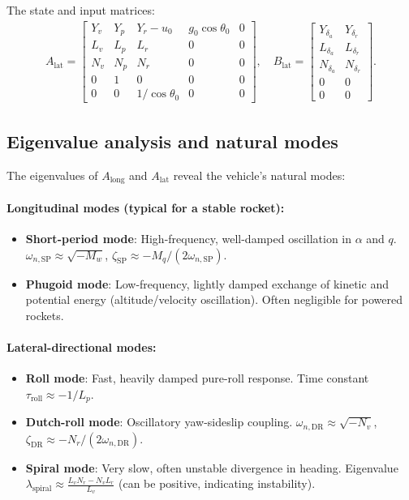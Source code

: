 \documentclass[11pt]{article}
\begin{document}
The state and input matrices:
\begin{align}
A_{\text{lat}} = \begin{bmatrix}
Y_v & Y_p & Y_r-u_0 & g_0\cos\theta_0 & 0\\
L_v & L_p & L_r & 0 & 0\\
N_v & N_p & N_r & 0 & 0\\
0 & 1 & 0 & 0 & 0\\
0 & 0 & 1/\cos\theta_0 & 0 & 0
\end{bmatrix},\quad
B_{\text{lat}} = \begin{bmatrix}
Y_{\delta_a} & Y_{\delta_r}\\
L_{\delta_a} & L_{\delta_r}\\
N_{\delta_a} & N_{\delta_r}\\
0 & 0\\
0 & 0
\end{bmatrix}.
\end{align}

\subsection{Eigenvalue analysis and natural modes}
The eigenvalues of $A_{\text{long}}$ and $A_{\text{lat}}$ reveal the vehicle's natural modes:

\paragraph{Longitudinal modes (typical for a stable rocket):}
\begin{itemize}[leftmargin=2em]
\item \textbf{Short-period mode}: High-frequency, well-damped oscillation in $\alpha$ and $q$. $\omega_{n,\text{SP}}\approx \sqrt{-M_w}$, $\zeta_{\text{SP}}\approx -M_q/(2\omega_{n,\text{SP}})$.
\item \textbf{Phugoid mode}: Low-frequency, lightly damped exchange of kinetic and potential energy (altitude/velocity oscillation). Often negligible for powered rockets.
\end{itemize}

\paragraph{Lateral-directional modes:}
\begin{itemize}[leftmargin=2em]
\item \textbf{Roll mode}: Fast, heavily damped pure-roll response. Time constant $\tau_{\text{roll}}\approx -1/L_p$.
\item \textbf{Dutch-roll mode}: Oscillatory yaw-sideslip coupling. $\omega_{n,\text{DR}}\approx \sqrt{-N_v}$, $\zeta_{\text{DR}}\approx -N_r/(2\omega_{n,\text{DR}})$.
\item \textbf{Spiral mode}: Very slow, often unstable divergence in heading. Eigenvalue $\lambda_{\text{spiral}}\approx \frac{L_v N_r - N_v L_r}{L_v}$ (can be positive, indicating instability).
\end{itemize}
\end{document}
